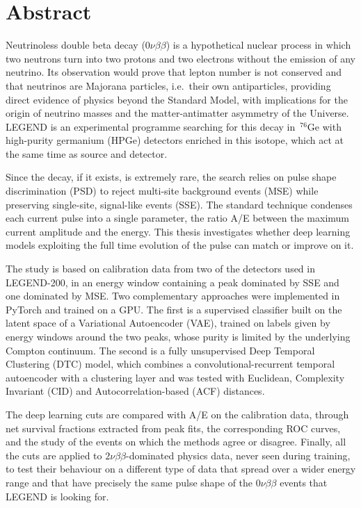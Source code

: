\chapter*{Abstract}

Neutrinoless double beta decay ($0\nu\beta\beta$) is a hypothetical nuclear process in which two neutrons turn into two protons and two electrons without the emission of any neutrino. Its observation would prove that lepton number is not conserved and that neutrinos are Majorana particles, i.e.\ their own antiparticles, providing direct evidence of physics beyond the Standard Model, with implications for the origin of neutrino masses and the matter-antimatter asymmetry of the Universe. LEGEND is an experimental programme searching for this decay in~${}^{76}$Ge with high-purity germanium (HPGe) detectors enriched in this isotope, which act at the same time as source and detector.

Since the decay, if it exists, is extremely rare, the search relies on pulse shape discrimination (PSD) to reject multi-site background events (MSE) while preserving single-site, signal-like events (SSE). The standard technique condenses each current pulse into a single parameter, the ratio A/E between the maximum current amplitude and the energy. This thesis investigates whether deep learning models exploiting the full time evolution of the pulse can match or improve on it.

The study is based on calibration data from two of the detectors used in LEGEND-200, in an energy window containing a peak dominated by SSE and one dominated by MSE. Two complementary approaches were implemented in PyTorch and trained on a GPU. The first is a supervised classifier built on the latent space of a Variational Autoencoder (VAE), trained on labels given by energy windows around the two peaks, whose purity is limited by the underlying Compton continuum. The second is a fully unsupervised Deep Temporal Clustering (DTC) model, which combines a convolutional-recurrent temporal autoencoder with a clustering layer and was tested with Euclidean, Complexity Invariant (CID) and Autocorrelation-based (ACF) distances.

The deep learning cuts are compared with A/E on the calibration data, through net survival fractions extracted from peak fits, the corresponding ROC curves, and the study of the events on which the methods agree or disagree. Finally, all the cuts are applied to $2\nu\beta\beta$-dominated physics data, never seen during training, to test their behaviour on a different type of data that spread over a wider energy range and that have precisely the same pulse shape of the $0\nu\beta\beta$ events that LEGEND is looking for.